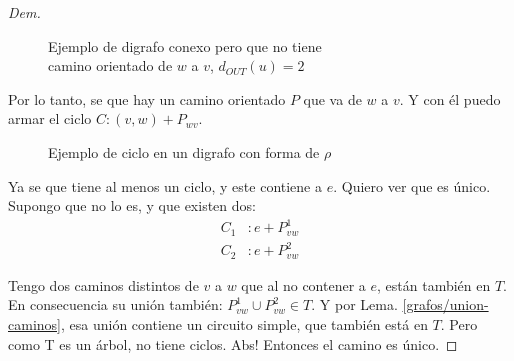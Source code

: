 \documentclass[12pt, a4paper]{report}
\theoremstyle{definition} %
\begin{document}
\begin{enumerate}[a)]
\begin{proof}[Dem]
\begin{itemize}
        \begin{figure}[H]
            \centering
            \caption*{Ejemplo de digrafo conexo pero que no tiene\\ camino orientado de $w$ a $v$, $d_{OUT}(u) = 2$}
        \end{figure}

        Por lo tanto, se que hay un camino orientado $P$ que va de $w$ a $v$. Y con él puedo armar el ciclo $C: (v, w) + P_{wv}$.

        \begin{figure}[H]
            \centering
            \caption*{Ejemplo de ciclo en un digrafo con forma de $\rho$}
        \end{figure}
    \end{itemize}

    Ya se que tiene al menos un ciclo, y este contiene a $e$. Quiero ver que es único. Supongo que no lo es, y que existen dos:
    \begin{align*}
        C_1 &: e + P^1_{vw}\\
        C_2 &: e + P^2_{vw}
    \end{align*}

    Tengo dos caminos distintos de $v$ a $w$ que al no contener a $e$, están también en $T$. En consecuencia su unión también: $P^1_{vw} \cup P^2_{vw} \in T$. Y por Lema. \ref{grafos/union-caminos}, esa unión contiene un circuito simple, que también está en $T$. Pero como T es un árbol, no tiene ciclos. Abs! Entonces el camino es único.


\end{proof}
\end{enumerate}
\end{document}
